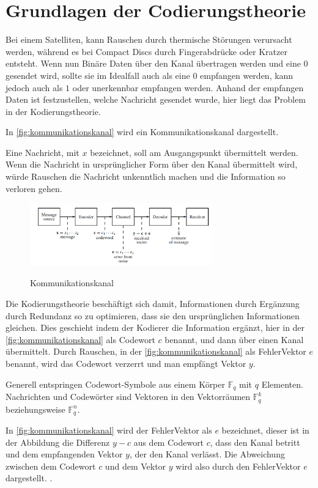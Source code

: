 \chapter{Grundlagen der Codierungstheorie}

\begin{Beispiel}
    Bei einem Satelliten, kann Rauschen durch thermische Störungen verursacht werden, während es bei Compact Discs durch Fingerabdrücke oder Kratzer entsteht. Wenn nun Binäre Daten über den Kanal übertragen werden und eine $0$ gesendet wird, sollte sie im Idealfall auch als eine $0$ empfangen werden, kann jedoch auch als $1$ oder unerkennbar empfangen werden. Anhand der empfangen Daten ist festzustellen, welche Nachricht gesendet wurde, hier liegt das Problem in der Kodierungstheorie.
    
    In \autoref{fig:kommunikationskanal} wird ein Kommunikationskanal dargestellt. 
    
    Eine Nachricht, mit \(x\) bezeichnet, soll am Ausgangspunkt übermittelt werden. Wenn die Nachricht in ursprünglicher Form über den Kanal übermittelt wird, würde Rauschen die Nachricht unkenntlich machen und die Information so verloren gehen.
    
    \begin{figure}[!ht]
        \centering
        {\includegraphics[width=0.7\textwidth]{./pic/LDPC-Codes1}}
        \caption{Kommunikationskanal}
        \label{fig:kommunikationskanal}
    \end{figure} 
    
    
    Die Kodierungstheorie beschäftigt sich damit, Informationen durch Ergänzung durch Redundanz so zu optimieren, dass sie den ursprünglichen Informationen gleichen. Dies geschieht indem der Kodierer die Information ergänzt, hier in der \autoref{fig:kommunikationskanal} als Codewort \(c\) benannt, und dann über einen Kanal übermittelt. Durch Rauschen, in der \autoref{fig:kommunikationskanal} als FehlerVektor \(e\) benannt, wird das Codewort verzerrt und man empfängt Vektor \(y\).
    
    
    Generell entspringen Codewort-Symbole aus einem Körper $\mathbb{F}_q$ mit \(q\) Elementen. Nachrichten und Codewörter sind Vektoren in den Vektorräumen $\mathbb{F}_{q}^{k}$ beziehungsweise $\mathbb{F}_{q}^{n}$.
    
    In \autoref{fig:kommunikationskanal} wird der FehlerVektor als \(e\) bezeichnet, dieser ist in der Abbildung die Differenz \( y - c \) aus dem Codewort \(c\), dass den Kanal betritt und dem empfangenden Vektor \(y\), der den Kanal verlässt. Die Abweichung zwischen dem Codewort \(c\)
    und dem Vektor \(y\) wird also durch den FehlerVektor \(e\) dargestellt. \cite[S. 2]{huffman}.
\end{Beispiel} 
    
